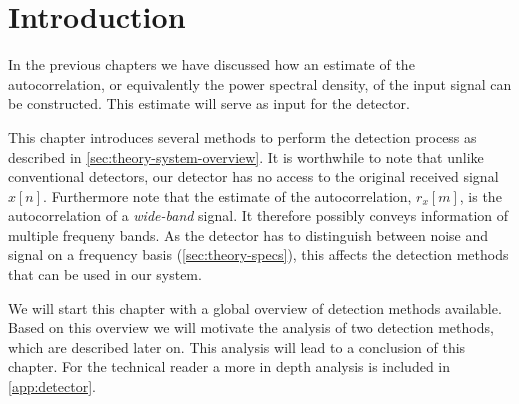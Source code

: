\documentclass[a4paper, openany, oneside]{memoir}
\begin{document}
\section{Introduction}
In the previous chapters we have discussed how an estimate of the autocorrelation, or equivalently the power spectral density, of the input signal can be constructed. This estimate will serve
as input for the detector.

This chapter introduces several methods to perform the detection process as described in \cref{sec:theory-system-overview}. It is worthwhile to note that unlike conventional detectors, our detector has no access to the original received signal $x[n]$. Furthermore note that the estimate of the autocorrelation, $r_x[m]$, is the autocorrelation of a \emph{wide-band} signal. It therefore possibly conveys information of multiple frequeny bands. As the detector has to distinguish between noise and signal on a frequency basis (\cref{sec:theory-specs}), this affects the detection methods that can be used in our system.  

We will start this chapter with a global overview of detection methods available. Based on this overview we will motivate the analysis of two detection methods, which are described later on. This analysis will lead to a conclusion of this chapter. For the technical reader a more in depth analysis is included in \cref{app:detector}.
\end{document}
